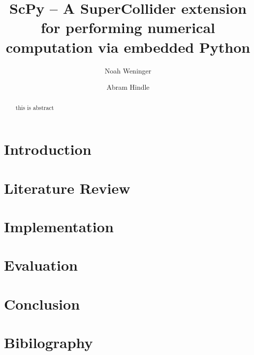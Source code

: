 \documentclass{article}
\begin{document}
\title{ScPy -- A SuperCollider extension for performing numerical computation via embedded Python}
\author{Noah Weninger \and Abram Hindle}

\maketitle
\tableofcontents

\begin{abstract}
    this is abstract
\end{abstract}

\section{Introduction}

\section{Literature Review}

\section{Implementation}

\section{Evaluation}

\section{Conclusion}

\section{Bibilography}
\end{document}
